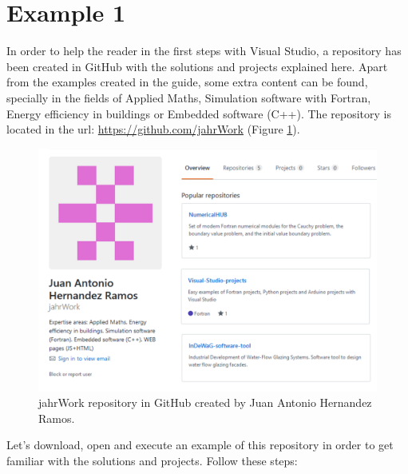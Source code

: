 \FloatBarrier
\section{Example 1} \label{sec:Ex2}

In order to help the reader in the first steps with Visual Studio, a repository has been created in GitHub with the solutions and projects explained here. Apart from the examples created in the guide, some extra content can be found, specially in the fields of Applied Maths, Simulation software with Fortran, Energy efficiency in buildings or Embedded software (C++). The repository is located in the url: \url{https://github.com/jahrWork} (Figure \ref{fig:repository}).

\begin{figure}
    \centering
    \includegraphics[width= .92\textwidth]{Figures/repository2}
    \caption{jahrWork repository in GitHub created by Juan Antonio Hernandez Ramos.}
    \label{fig:repository}
\end{figure}

Let's download, open and execute an example of this repository in order to get familiar with the solutions and projects. Follow these steps:

